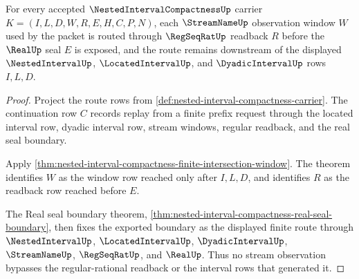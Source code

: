 \begin{theorem}
\label{thm:nested-interval-compactness-stream-real-route}
For every accepted $\NestedIntervalCompactnessUp$ carrier $K=(I,L,D,W,R,E,H,C,P,N)$, each $\StreamNameUp$ observation window $W$ used by the packet is routed through $\RegSeqRatUp$ readback $R$ before the $\RealUp$ seal $E$ is exposed, and the route remains downstream of the displayed $\NestedIntervalUp$, $\LocatedIntervalUp$, and $\DyadicIntervalUp$ rows $I,L,D$.
\end{theorem}
\begin{proof}
Project the route rows from \autoref{def:nested-interval-compactness-carrier}. The continuation row $C$ records replay from a finite prefix request through the located interval row, dyadic interval row, stream windows, regular readback, and the real seal boundary.

Apply \autoref{thm:nested-interval-compactness-finite-intersection-window}. The theorem identifies $W$ as the window row reached only after $I,L,D$, and identifies $R$ as the readback row reached before $E$.

The Real seal boundary theorem, \autoref{thm:nested-interval-compactness-real-seal-boundary}, then fixes the exported boundary as the displayed finite route through $\NestedIntervalUp$, $\LocatedIntervalUp$, $\DyadicIntervalUp$, $\StreamNameUp$, $\RegSeqRatUp$, and $\RealUp$. Thus no stream observation bypasses the regular-rational readback or the interval rows that generated it.
\end{proof}

